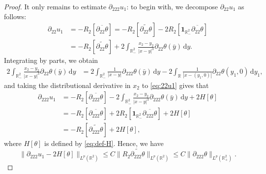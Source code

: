 \documentclass[10pt]{amsart}
\theoremstyle{definition}
\theoremstyle{remark}
\numberwithin{equation}{section}
\newcommand{\ud}{\mathrm{d}}
\newcommand{\rd}{\partial}
\newcommand{\0}{\emptyset}
\newcommand{\tht}{\theta}
\newcommand{\bbR}{\mathbb R}
\begin{document}
\begin{proof}
		It only remains to estimate $\rd_{222}u_{1}$: to begin with, we decompose  $	\rd_{22} u_{1}$ as follows:  \begin{equation}\label{eq:22u1}
			\begin{aligned}
				\rd_{22} u_{1} &= -R_{2} [\overline{\rd_{22}\tht}] = - R_{2} [\widetilde{\rd_{22}\tht}] - 2 R_{2} [ \mathbf{1}_{\bbR^{2}_{-}} \overline{\rd_{22}\tht} ] \\
				&= - R_{2} [\widetilde{\rd_{22}\tht}] +2\int_{\bbR^2_{-}} \frac{x_2-y_2}{|x-y|^3} \partial_{22} \tht(\bar{y}) \,\ud y.
			\end{aligned}
		\end{equation}  Integrating by parts, we obtain\begin{equation*}
			\begin{aligned}
				2 \int_{\bbR^2_{-}} \frac{x_2-y_2}{|x-y|^3} \partial_{22} \tht(\bar{y}) \,\ud y &= 2\int_{\bbR^2_{-}} \frac{1}{|x-y|} \partial_{222} \tht(\bar{y}) \,\ud y - 2\int_{\bbR} \frac{1}{|x-(y_1,0)|} \partial_{22} \tht(y_1,0) \,\ud y_1,
			\end{aligned}
		\end{equation*} and taking the distributional derivative in $x_{2}$ to \eqref{eq:22u1} gives that  \begin{equation}\label{eq:222u1}
			\begin{aligned}
				\partial_{222}u_1 &= - R_{2} [\overline{\partial_{222}\tht}] - 2\int_{\bbR^2_{-}} \frac{x_2-y_2}{|x-y|^3} \partial_{222} \tht(\bar{y}) \,\ud y + 2H[\tht] \\
				&= - R_{2} [\overline{\partial_{222}\tht}] +2R_{2} [ \mathbf{1}_{\bbR^{2}_{-}} \overline{\rd_{222}\tht} ] + 2 H[\tht] \\
				&= - R_{2} [\widetilde{\partial_{222}\tht}] + 2 H[\tht],
			\end{aligned}
		\end{equation} where $H[\tht]$ is defined by \eqref{eq:def-H}. Hence, we have \begin{equation*}
			\| \partial_{222}u_1 - 2 H[\tht] \|_{L^p(\bbR^2)} \leq C\| R_{2} \widetilde{\partial_{222}\tht} \|_{L^p(\bbR^2)} \leq C\| \partial_{222}\tht \|_{L^p(\bbR^2_{+})}.
		\end{equation*} %

\end{proof}
\end{document}
